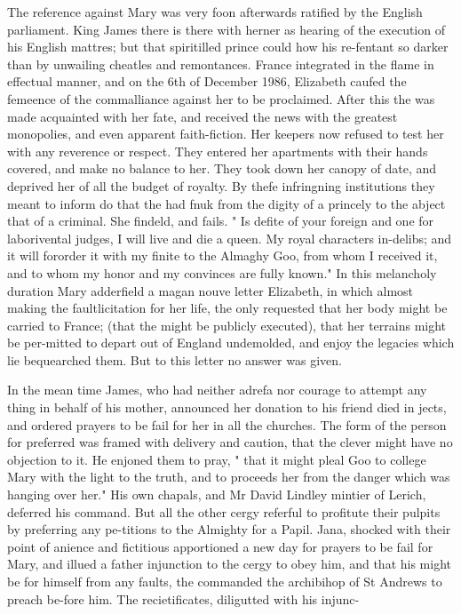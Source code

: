 \documentclass{article}
\begin{document}
The reference against Mary was very foon afterwards ratified by the English parliament. King James there is there with herner as hearing of the execution of his English mattres; but that spiritilled prince could how his re-fentant so darker than by unwailing cheatles and remontances. France integrated in the flame in effectual manner, and on the 6th of December 1986, Elizabeth caufed the femeence of the commalliance against her to be proclaimed. After this the was made acquainted with her fate, and received the news with the greatest monopolies, and even apparent faith-fiction. Her keepers now refused to test her with any reverence or respect. They entered her apartments with their hands covered, and make no balance to her. They took down her canopy of date, and deprived her of all the budget of royalty. By thefe infringning institutions they meant to inform do that the had fnuk from the digity of a princely to the abject that of a criminal. She findeld, and fails. " Is defite of your foreign and one for laborivental judges, I will live and die a queen. My royal characters in-delibs; and it will fororder it with my finite to the Almaghy Goo, from whom I received it, and to whom my honor and my convinces are fully known." In this melancholy duration Mary adderfield a magan nouve letter Elizabeth, in which almost making the faultlicitation for her life, the only requested that her body might be carried to France; (that the might be publicly executed), that her terrains might be per-mitted to depart out of England undemolded, and enjoy the legacies which lie bequearched them. But to this letter no answer was given.

In the mean time James, who had neither adrefa nor courage to attempt any thing in behalf of his mother, announced her donation to his friend died in jects, and ordered prayers to be fail for her in all the churches. The form of the person for preferred was framed with delivery and caution, that the clever might have no objection to it. He enjoned them to pray, " that it might pleal Goo to college Mary with the light to the truth, and to proceeds her from the danger which was hanging over her." His own chapals, and Mr David Lindley mintier of Lerich, deferred his command. But all the other cergy referful to profitute their pulpits by preferring any pe-titions to the Almighty for a Papil. Jana, shocked with their point of anience and fictitious apportioned a new day for prayers to be fail for Mary, and illued a father injunction to the cergy to obey him, and that his might be for himself from any faults, the commanded the archibihop of St Andrews to preach be-fore him. The recietificates, diligutted with his injunc-
\end{document}
